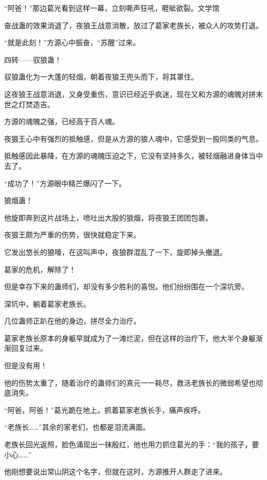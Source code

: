 
\begin{this_body}

“阿爸！”那边葛光看到这样一幕，立刻嘶声狂吼，睚眦欲裂。文学馆

奋战蛊的效果消退了，夜狼王战意消散，放过了葛家老族长，被众人的攻势打退。

“就是此刻！”方源心中振奋，“苏醒”过来。

四转——驭狼蛊！

驭狼蛊化为一大蓬的轻烟，朝着夜狼王兜头而下，将其罩住。

这夜狼王战意消退，又身受重伤，意识已经近乎疯迷，现在又和方源的魂魄对拼末世之灯焚造吉。

方源的魂魄之强，已经高于百人魂。

夜狼王心中有强烈的抵触感，但是从方源的狼人魂中，它感受到一股同类的气息。

抵触感因此暴降，在方源的魂魄压迫之下，它没有坚持多久，被轻烟融进身体当中去了。

“成功了！”方源眼中精芒爆闪了一下。

狼烟蛊！

他旋即奔到这片战场上，喷吐出大股的狼烟，将夜狼王团团包裹。

夜狼王颇为严重的伤势，很快就稳定下来。

它发出悠长的狼嚎，在这叫声中，夜狼群混乱了一下，旋即掉头撤退。

葛家的危机，解除了！

但是幸存下来的蛊师们，却没有多少胜利的喜悦。他们纷纷围在一个深坑旁。

深坑中，躺着葛家老族长。

几位蛊师正趴在他的身边，拼尽全力治疗。

葛家老族长原本的身躯早就成为了一滩烂泥，但在这样的治疗下，他大半个身躯渐渐回复过来。

但是没有用！

他的伤势太重了，随着治疗的蛊师们的真元一一耗尽，救活老族长的微弱希望也彻底消失。

“阿爸，阿爸！”葛光跪在地上。抓着葛家老族长手，痛声疾呼。

“老族长……”其余的家老们，也都是泪流满面。

老族长回光返照，脸色涌现出一抹殷红，他也用力抓住葛光的手：“我的孩子，要小心……”

他刚想要说出常山阴这个名字，但就在这时，方源推开人群走了进来。


\end{this_body}
